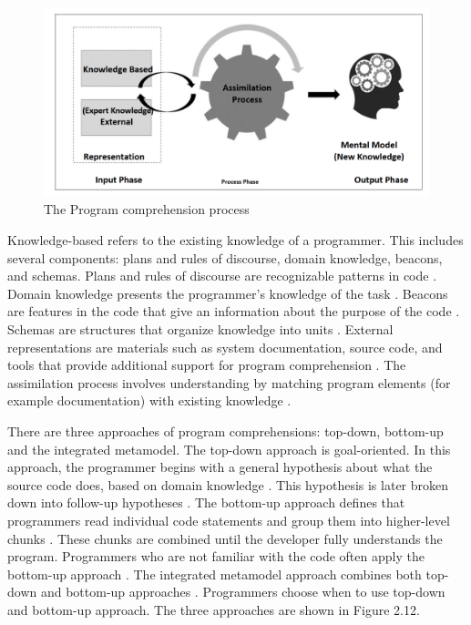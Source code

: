 \begin{figure} [H]
  \centering
  \includegraphics[width=\textwidth]{figures/program_Comprehension_Process.png}
  \caption{The Program comprehension process \cite[p. 5]{kadar2021program}}
  \label{fig:AnhangsChor}
\end{figure}




Knowledge-based refers to the existing knowledge of a programmer. This includes several components: plans and rules of discourse, domain knowledge, beacons, and schemas. Plans and rules of discourse are recognizable patterns in code \cite{fekete2020comprehensive}. Domain knowledge presents the programmer’s knowledge of the task \cite{kadar2021program}.
Beacons are features in the code that give an information about the purpose of the code \cite{fekete2020comprehensive}. Schemas are structures that organize knowledge into units \cite{kadar2021program}. External representations are materials such as system documentation, source code, and tools that provide additional support for program comprehension \cite{kadar2021program}. The assimilation process involves understanding by matching program elements (for example documentation) with existing knowledge \cite{von1995program}. 



There are three approaches of program comprehensions:  top-down, bottom-up and the integrated metamodel. The top-down approach is goal-oriented. In this approach, the programmer begins with a general hypothesis about what the source code does, based on domain knowledge \cite{storey2005theories}. This hypothesis is later broken down into follow-up hypotheses  \cite{fekete2020comprehensive}. The bottom-up approach defines that programmers read individual code statements and group them into higher-level chunks \cite{storey2005theories}. These chunks are combined until the developer fully understands the program.  Programmers who are not familiar with the code often apply the bottom-up approach \cite{kadar2021program}. The integrated metamodel approach combines both top-down and bottom-up approaches \cite{kadar2021program}.  Programmers choose when to use top-down and bottom-up approach.  The three approaches are shown in Figure 2.12.  



